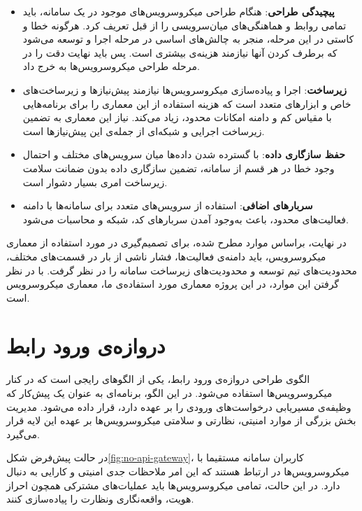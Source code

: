 \begin{itemize}
	 \item \textbf{پیچیدگی طراحی}: هنگام طراحی میکروسرویس‌های موجود در یک سامانه، باید تمامی روابط و هماهنگی‌های میان‌سرویسی را از قبل تعریف کرد. هرگونه خطا و کاستی در این مرحله، منجر به چالش‌های اساسی در مرحله اجرا و توسعه می‌شود که برطرف کردن آنها نیازمند هزینه‌ی بیشتری است. پس باید نهایت دقت را در مرحله طراحی میکروسرویس‌ها به خرج داد.
	
	 \item \textbf{زیرساخت}: اجرا و پیاده‌سازی میکروسرویس‌ها نیازمند پیش‌نیاز‌ها و زیرساخت‌های خاص و ابزار‌های متعدد است که هزینه استفاده از این معماری را برای برنامه‌هایی با مقیاس کم و دامنه امکانات محدود، زیاد می‌کند. نیاز این معماری به تضمین زیرساخت اجرایی و شبکه‌ای از جمله‌ی این پیش‌نیازها است.
	
	 \item \textbf{حفظ سازگاری داده}: با گسترده شدن داده‌ها میان سرویس‌های مختلف و احتمال وجود خطا در هر قسم از سامانه، تضمین سازگاری داده بدون ضمانت سلامت زیرساخت امری بسیار دشوار است.
	
	 \item \textbf{سربارهای اضافی}: استفاده از سرویس‌های متعدد برای سامانه‌ها با دامنه فعالیت‌های محدود، باعث به‌وجود آمدن سربار‌های کد، شبکه و محاسبات می‌شود.
\end{itemize}

در نهایت، براساس موارد مطرح شده، برای تصمیم‌گیری در مورد استفاده از معماری میکروسرویس، باید دامنه‌ی فعالیت‌ها، فشار ناشی از بار در قسمت‌های مختلف، محدودیت‌های تیم توسعه و محدودیت‌های زیرساخت سامانه را در نظر گرفت. با در نظر گرفتن این موارد، در این پروژه معماری مورد استفاده‌ی ما، معماری میکروسرویس است.

\section{‌دروازه‌ی ورود رابط}
الگوی طراحی ‌دروازه‌ی ورود رابط، یکی از الگوهای رایجی است که در کنار میکروسرویس‌ها استفاده می‌شود. در این الگو، برنامه‌ای به عنوان یک پیش‌کار که وظیفه‌ی مسیریابی درخواست‌های ورودی را بر عهده دارد، قرار داده می‌شود. مدیریت بخش بزرگی از موارد امنیتی، نظارتی و سلامتی میکروسرویس‌ها بر عهده این لایه قرار می‌گیرد.

در حالت پیش‌فرض شکل\ref{fig:no-api-gateway}، کاربران سامانه مستقیما با میکروسرویس‌ها در ارتباط هستند که این امر ملاحظات جدی امنیتی و کارایی به دنبال دارد. در این حالت، تمامی میکروسرویس‌ها باید عملیات‌های مشترکی همچون احراز هویت، واقعه‌نگاری ونظارت را پیاده‌سازی کنند.


